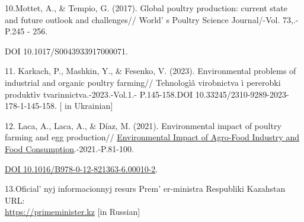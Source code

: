 \begin{references}
10.Mottet, A., \& Tempio, G. (2017). Global poultry production: current
state and future outlook and challenges// World' s
Poultry Science Journal/-Vol. 73,.-P.245 - 256.

DOI 10.1017/S0043933917000071.

11. Karkach, P., Mashkin, Y., \& Fesenko, V. (2023). Environmental
problems of industrial and organic poultry farming// Tehnologìâ
virobnictva ì pererobki produktìv tvarinnictva.-2023.-Vol.1.-
P.145-158.DOI 10.33245/2310-9289-2023-178-1-145-158. {[} in Ukrainian{]}

12. Laca, A., Laca, A., \& Díaz, M. (2021). Environmental impact of
poultry farming and egg
production// \href{https://www.sciencedirect.com/book/9780128213636/environmental-impact-of-agro-food-industry-and-food-consumption}{Environmental
Impact of Agro-Food Industry and Food Consumption}.-2021.-P.81-100.

\href{https://doi.org/10.1016/B978-0-12-821363-6.00010-2}{DOI
10.1016/B978-0-12-821363-6.00010-2}.

13.Oficial' nyj informacionnyj resurs
Prem' er-ministra Respubliki Kazahstan URL:\\
\href{https://primeminister.kz/ru/news/investitsii-v-apk-pozvolyat-za-2-goda-polnostyu-
zakryt-potrebnost-v-myase-ptitsy-i-nachat-eksport-28485/}{https://primeminister.kz} {[}in Russian{]}
\end{references}

